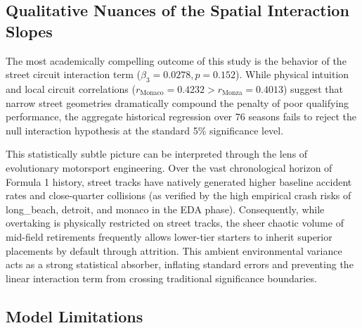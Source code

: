 \subsection{Qualitative Nuances of the Spatial Interaction Slopes}
\label{subsec:qualitative_nuances}

The most academically compelling outcome of this study is the behavior of the street circuit interaction term ($\beta_3 = 0.0278, p = 0.152$). While physical intuition and local circuit correlations ($r_{\text{Monaco}} = 0.4232 > r_{\text{Monza}} = 0.4013$) suggest that narrow street geometries dramatically compound the penalty of poor qualifying performance, the aggregate historical regression over 76 seasons fails to reject the null interaction hypothesis at the standard 5\% significance level.

This statistically subtle picture can be interpreted through the lens of evolutionary motorsport engineering. Over the vast chronological horizon of Formula 1 history, street tracks have natively generated higher baseline accident rates and close-quarter collisions (as verified by the high empirical crash risks of long\_beach, detroit, and monaco in the EDA phase). Consequently, while overtaking is physically restricted on street tracks, the sheer chaotic volume of mid-field retirements frequently allows lower-tier starters to inherit superior placements by default through attrition. This ambient environmental variance acts as a strong statistical absorber, inflating standard errors and preventing the linear interaction term from crossing traditional significance boundaries. 

\subsection{Model Limitations}
\label{subsec:limitations}

